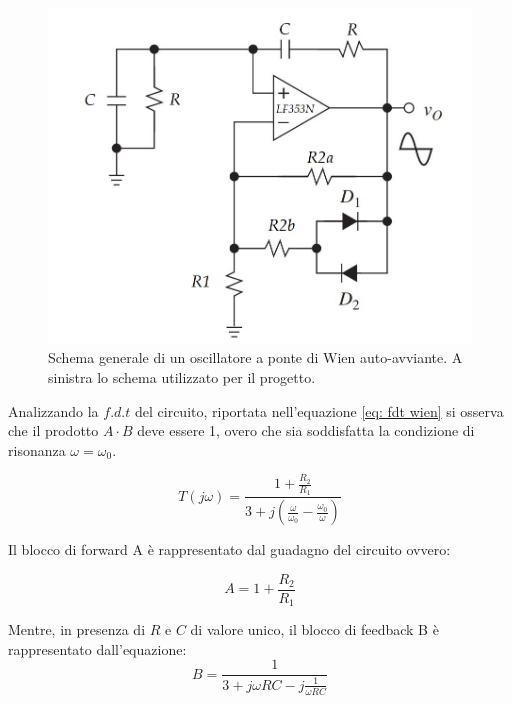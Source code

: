 \documentclass[titlepage]{report}
\begin{document}
	\begin{figure}[h]
		\centering
		\includegraphics[scale=0.4]{Immagini/sch_osc_wien.jpg}
		\caption{Schema generale di un oscillatore a ponte di Wien auto-avviante. A sinistra lo schema utilizzato per il progetto.}
		\label{fig:sch_osc_wien}
	\end{figure}

	\noindent Analizzando la $f.d.t$ del circuito, riportata nell'equazione \ref{eq: fdt wien} si osserva che il prodotto $A\cdot B$ deve essere 1, overo che sia soddisfatta la condizione di risonanza \textit{$\omega = \omega_0$}.
 
	\begin{equation}
		\label{eq:LF356_Gain}
		T(j\omega) = \frac{1 + \frac{R_2}{R_1}}{3 + j(\frac{\omega}{\omega_0} - \frac{\omega_0}{\omega})}
		\label{eq: fdt wien}
	\end{equation}

	Il blocco di forward A è rappresentato dal guadagno del circuito ovvero:

	\begin{equation}
		\label{eq:LF356_Gain}
		A = 1 + \frac{R_2}{R_1}
	\end{equation}


	Mentre, in presenza di $R$ e $C$ di valore unico, il blocco di feedback B è rappresentato dall'equazione:
	\\
	\begin{equation}
		\label{eq:LF356_Feedback}
		B = \frac{1}{3 + j\omega RC  - j\frac{1}{\omega RC}}
	\end{equation}
	\\
\end{document}
